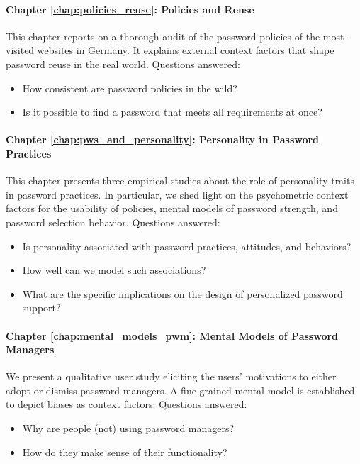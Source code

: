 \paragraph{Chapter \ref{chap:policies_reuse}: Policies and Reuse} %
This chapter reports on a thorough audit of the password policies of the most-visited websites in Germany. It explains  external context factors that shape password reuse in the real world.
Questions answered: \vspace*{-5pt} \begin{itemize}[leftmargin=*,itemsep=-5pt]
	\item How consistent are password policies in the wild?
	\item Is it possible to find a password that meets all requirements at once?
\end{itemize}


\paragraph{Chapter \ref{chap:pws_and_personality}: Personality in Password Practices} %
This chapter presents three empirical studies about the role of personality traits in password practices. In particular, we shed light on the psychometric context factors for the usability of policies, mental models of password strength, and password selection behavior.
Questions answered: \vspace*{-5pt} \begin{itemize}[leftmargin=*,itemsep=-5pt]
	\item Is personality associated with password practices, attitudes, and behaviors?
	\item How well can we model such associations?
	\item What are the specific implications on the design of personalized password support?
\end{itemize}

\paragraph{Chapter \ref{chap:mental_models_pwm}: Mental Models of Password Managers} %
We present a qualitative user study eliciting the users' motivations to either adopt or dismiss password managers. A fine-grained mental model is established to depict biases as context factors.
Questions answered: \vspace*{-5pt} \begin{itemize}[leftmargin=*,itemsep=-5pt]
	\item Why are people (not) using password managers?
	\item How do they make sense of their functionality?
\end{itemize}

